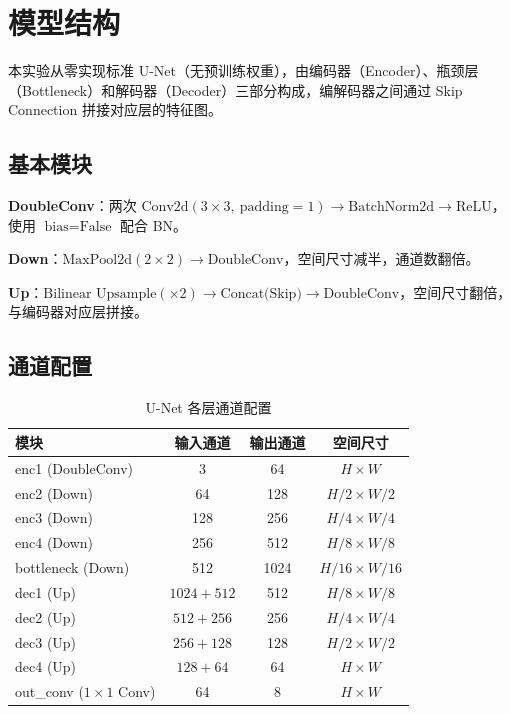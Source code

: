 \documentclass[UTF8,a4paper,12pt,fontset=fandol]{ctexart}
\begin{document}
\section{模型结构}

本实验从零实现标准 U-Net（无预训练权重），由编码器（Encoder）、瓶颈层（Bottleneck）和解码器（Decoder）三部分构成，编解码器之间通过 Skip Connection 拼接对应层的特征图。

\subsection{基本模块}

\textbf{DoubleConv}：两次 $\text{Conv2d}(3\times3,\ \text{padding}=1) \to \text{BatchNorm2d} \to \text{ReLU}$，使用 $\text{bias}=\text{False}$ 配合 BN。

\textbf{Down}：$\text{MaxPool2d}(2\times2) \to \text{DoubleConv}$，空间尺寸减半，通道数翻倍。

\textbf{Up}：$\text{Bilinear Upsample}(\times2) \to \text{Concat(Skip)} \to \text{DoubleConv}$，空间尺寸翻倍，与编码器对应层拼接。

\subsection{通道配置}

\begin{table}[H]
\centering
\caption{U-Net 各层通道配置}
\begin{tabular}{lccc}
\toprule
模块 & 输入通道 & 输出通道 & 空间尺寸 \\
\midrule
enc1 (DoubleConv) & 3 & 64 & $H \times W$ \\
enc2 (Down) & 64 & 128 & $H/2 \times W/2$ \\
enc3 (Down) & 128 & 256 & $H/4 \times W/4$ \\
enc4 (Down) & 256 & 512 & $H/8 \times W/8$ \\
bottleneck (Down) & 512 & 1024 & $H/16 \times W/16$ \\
dec1 (Up) & $1024+512$ & 512 & $H/8 \times W/8$ \\
dec2 (Up) & $512+256$ & 256 & $H/4 \times W/4$ \\
dec3 (Up) & $256+128$ & 128 & $H/2 \times W/2$ \\
dec4 (Up) & $128+64$ & 64 & $H \times W$ \\
out\_conv ($1\times1$ Conv) & 64 & 8 & $H \times W$ \\
\bottomrule
\end{tabular}
\end{table}
\end{document}

